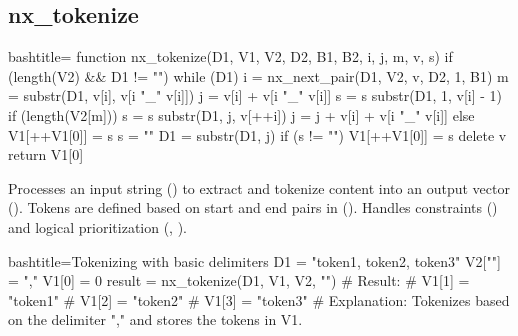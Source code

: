 \newpage
\subsection{nx_tokenize}
\label{nx_tokenize}
\begin{NexCodeBox}{bash}{title={}}
function nx_tokenize(D1, V1, V2, D2, B1, B2, i, j, m, v, s) {
	if (length(V2) && D1 != "") {
		while (D1) {
			i = nx_next_pair(D1, V2, v, D2, 1, B1)
			m = substr(D1, v[i], v[i "_" v[i]])
			j = v[i] + v[i "_" v[i]]
			s = s substr(D1, 1, v[i] - 1)
			if (length(V2[m])) {
				s = s substr(D1, j, v[++i])
				j = j + v[i] + v[i "_" v[i]]
			} else {
				V1[++V1[0]] = s
				s = ""
			}
			D1 = substr(D1, j)
		}
		if (s != "")
			V1[++V1[0]] = s
		delete v
		return V1[0]
	}
}
\end{NexCodeBox}

\begin{NexMainBox}
	\begin{NexMainBox}
		Processes an input string () to extract and tokenize content into an output vector (). Tokens are defined based on start and end pairs in (). Handles constraints () and logical prioritization (, ).
	\end{NexMainBox}
	\begin{NexMainBox}
		\begin{NexListDark}
		\end{NexListDark}
	\end{NexMainBox}
\end{NexMainBox}

\begin{NexCodeBox}{bash}{title={Tokenizing with basic delimiters}}
	D1 = "token1, token2, token3"
	V2[""] = ","
	V1[0] = 0
	result = nx_tokenize(D1, V1, V2, "")
	# Result:
	# V1[1] = "token1"
	# V1[2] = "token2"
	# V1[3] = "token3"
	# Explanation: Tokenizes based on the delimiter "," and stores the tokens in V1.
\end{NexCodeBox}

